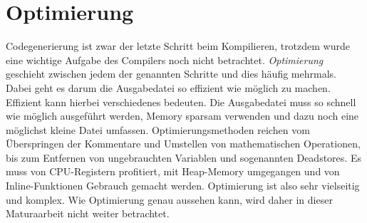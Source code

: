 \section{Optimierung}
Codegenerierung ist zwar der letzte Schritt beim Kompilieren, trotzdem wurde eine wichtige Aufgabe des Compilers noch nicht betrachtet. \textit{Optimierung} geschieht zwischen jedem der genannten Schritte und dies häufig mehrmals.
Dabei geht es darum die Ausgabedatei so effizient wie möglich zu machen. Effizient kann hierbei verschiedenes bedeuten.
Die Ausgabedatei muss so schnell wie möglich ausgeführt werden, Memory sparsam verwenden und dazu noch eine möglichst kleine Datei umfassen. 
Optimierungsmethoden reichen vom Überspringen der Kommentare und Umstellen von mathematischen Operationen, bis zum Entfernen von ungebrauchten Variablen und sogenannten Deadstores.
Es muss von CPU-Registern profitiert, mit Heap-Memory umgegangen und von Inline-Funktionen Gebrauch gemacht werden. Optimierung ist also sehr vielseitig und komplex.
Wie Optimierung genau aussehen kann, wird daher in dieser Maturaarbeit nicht weiter betrachtet.
